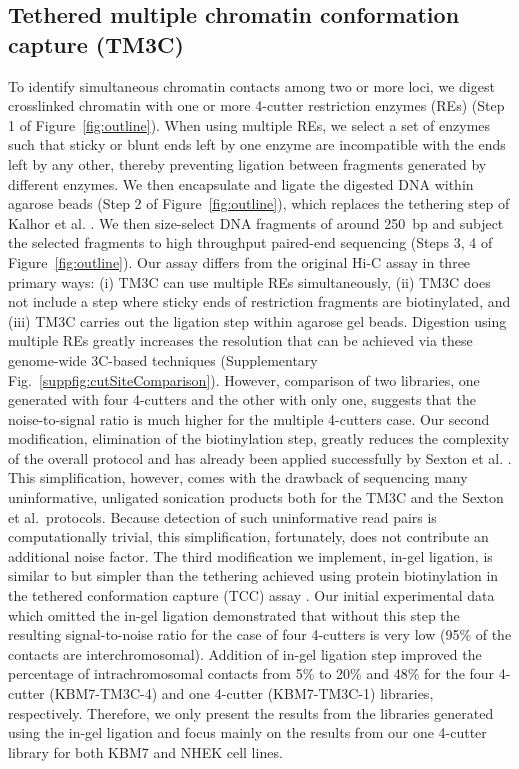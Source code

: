 \subsection*{Tethered multiple chromatin conformation capture (TM3C)}
To identify simultaneous chromatin contacts among two or more loci,
we digest crosslinked chromatin with one or more 4-cutter restriction
enzymes (REs) (Step 1 of Figure~\ref{fig:outline}). When using multiple
REs, we select a set of enzymes such that sticky or blunt ends left by one
enzyme are incompatible with the ends left by any other, thereby preventing
ligation between fragments generated by different enzymes. We then encapsulate
and ligate the digested DNA within agarose beads
(Step 2 of Figure~\ref{fig:outline}), which replaces the tethering step of Kalhor
et al. \cite{kalhor:genome}. We then size-select DNA fragments of around 250~bp
and subject the selected fragments to high throughput paired-end sequencing
(Steps 3, 4 of Figure~\ref{fig:outline}). Our assay differs from the original
Hi-C assay in three primary ways: (i) TM3C can use multiple REs simultaneously,
(ii) TM3C does not include a step where sticky ends of restriction fragments
are biotinylated, and (iii) TM3C carries out the ligation step within agarose
gel beads. Digestion using multiple REs greatly increases the resolution that
can be achieved via these genome-wide 3C-based techniques
(Supplementary Fig.~\ref{suppfig:cutSiteComparison}). However, comparison of
two libraries, one generated with four 4-cutters and the other with only one,
suggests that the noise-to-signal ratio is much higher for the multiple 4-cutters case.
Our second modification, elimination of the biotinylation step, greatly reduces
the complexity of the overall protocol and has already been applied successfully by
Sexton et al. \cite{sexton:three-dimensional}. This simplification, however,
comes with the drawback of sequencing many uninformative, unligated sonication
products both for the TM3C and the Sexton et al.\ protocols. Because detection of
such uninformative read pairs is computationally trivial, this simplification,
fortunately, does not contribute an additional noise factor. The third
modification we implement, in-gel ligation, is similar to but simpler
than the tethering achieved
using protein biotinylation in the tethered conformation capture (TCC)
assay \cite{kalhor:genome}. Our initial experimental data which omitted
the in-gel ligation demonstrated that without this step the resulting
signal-to-noise ratio for the case of four 4-cutters is very low
(95\% of the contacts are interchromosomal). Addition of in-gel ligation step
improved the percentage of intrachromosomal contacts from 5\% to 20\% and
48\% for the four 4-cutter (KBM7-TM3C-4) and one 4-cutter (KBM7-TM3C-1)
libraries, respectively. Therefore, we only present the results from the
libraries generated using the in-gel ligation and focus mainly on the
results from our one 4-cutter library for both KBM7 and NHEK cell lines.

